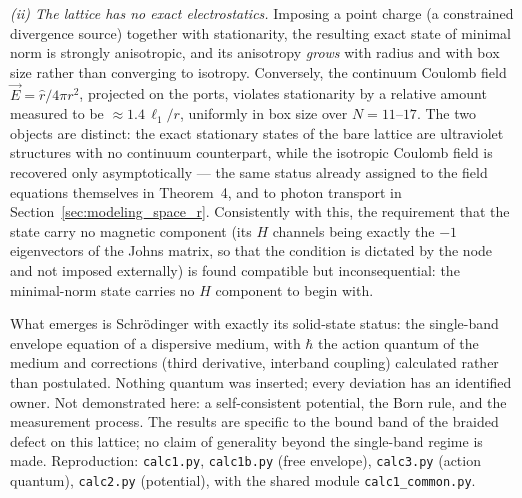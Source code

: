 \documentclass[11pt,a4paper]{article}
\theoremstyle{plain}
\theoremstyle{remark}
\begin{document}
\emph{(ii) The lattice has no exact electrostatics.} Imposing a point charge (a constrained divergence source) together with stationarity, the resulting exact state of minimal norm is strongly anisotropic, and its anisotropy \emph{grows} with radius and with box size rather than converging to isotropy. Conversely, the continuum Coulomb field $\vec E = \hat r/4\pi r^2$, projected on the ports, violates stationarity by a relative amount measured to be $\approx 1.4\,\ell_1/r$, uniformly in box size over $N = 11$--$17$. The two objects are distinct: the exact stationary states of the bare lattice are ultraviolet structures with no continuum counterpart, while the isotropic Coulomb field is recovered only asymptotically --- the same status already assigned to the field equations themselves in Theorem~4, and to photon transport in Section~\ref{sec:modeling_space_r}. Consistently with this, the requirement that the state carry no magnetic component (its $H$ channels being exactly the $-1$ eigenvectors of the Johns matrix, so that the condition is dictated by the node and not imposed externally) is found compatible but inconsequential: the minimal-norm state carries no $H$ component to begin with.

\medskip
\noindent What emerges is Schr\"odinger with exactly its solid-state status: the single-band envelope equation of a dispersive medium, with $\hbar$ the action quantum of the medium and corrections (third derivative, interband coupling) calculated rather than postulated. Nothing quantum was inserted; every deviation has an identified owner. Not demonstrated here: a self-consistent potential, the Born rule, and the measurement process. The results are specific to the bound band of the braided defect on this lattice; no claim of generality beyond the single-band regime is made. Reproduction: \texttt{calc1.py}, \texttt{calc1b.py} (free envelope), \texttt{calc3.py} (action quantum), \texttt{calc2.py} (potential), with the shared module \texttt{calc1\_common.py}.
\end{document}
